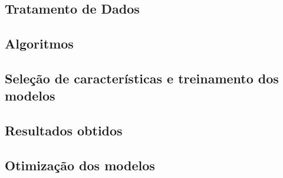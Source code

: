 		\subsection{Tratamento de Dados}

		\subsection{Algoritmos}

		\subsection{Seleção de características e treinamento dos modelos}
		
		\subsection{Resultados obtidos}

		\subsection{Otimização dos modelos}